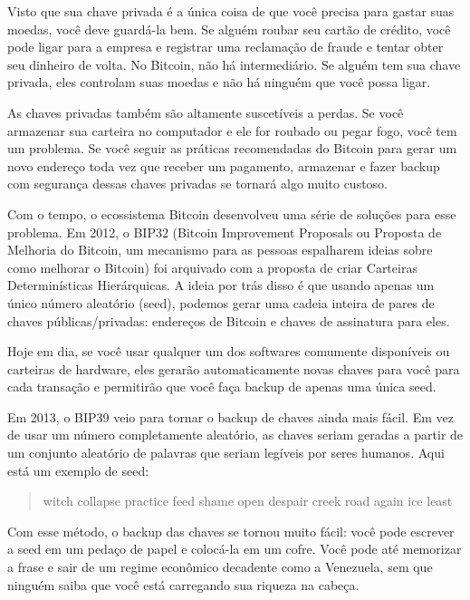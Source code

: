 Visto que sua chave privada é a única coisa de que você precisa para gastar suas moedas, você deve guardá-la bem. Se alguém roubar seu cartão de crédito, você pode ligar para a empresa e registrar uma reclamação de fraude e tentar obter seu dinheiro de volta. No Bitcoin, não há intermediário. Se alguém tem sua chave privada, eles controlam suas moedas e não há ninguém que você possa ligar.

As chaves privadas também são altamente suscetíveis a perdas. Se você armazenar sua carteira no computador e ele for roubado ou pegar fogo, você tem um problema. Se você seguir as práticas recomendadas do Bitcoin para gerar um novo endereço toda vez que receber um pagamento, armazenar e fazer backup com segurança dessas chaves privadas se tornará algo muito custoso.

Com o tempo, o ecossistema Bitcoin desenvolveu uma série de soluções para esse problema. Em 2012, o BIP32 (Bitcoin Improvement Proposals ou Proposta de Melhoria do Bitcoin, um mecanismo para as pessoas espalharem ideias sobre como melhorar o Bitcoin) foi arquivado com a proposta de criar Carteiras Determinísticas Hierárquicas. A ideia por trás disso é que usando apenas um único número aleatório (seed), podemos gerar uma cadeia inteira de pares de chaves públicas/privadas: endereços de Bitcoin e chaves de assinatura para eles.

Hoje em dia, se você usar qualquer um dos softwares comumente disponíveis ou carteiras de hardware, eles gerarão automaticamente novas chaves para você para cada transação e permitirão que você faça backup de apenas uma única seed.

Em 2013, o BIP39 veio para tornar o backup de chaves ainda mais fácil. Em vez de usar um número completamente aleatório, as chaves seriam geradas a partir de um conjunto aleatório de palavras que seriam legíveis por seres humanos. Aqui está um exemplo de seed:

\begin{samepage}
\begin{quote}{witch collapse practice feed shame open despair creek road again ice least}\end{quote}
\end{samepage}

Com esse método, o backup das chaves se tornou muito fácil: você pode escrever a seed em um pedaço de papel e colocá-la em um cofre. Você pode até memorizar a frase e sair de um regime econômico decadente como a Venezuela, sem que ninguém saiba que você está carregando sua riqueza na cabeça.

